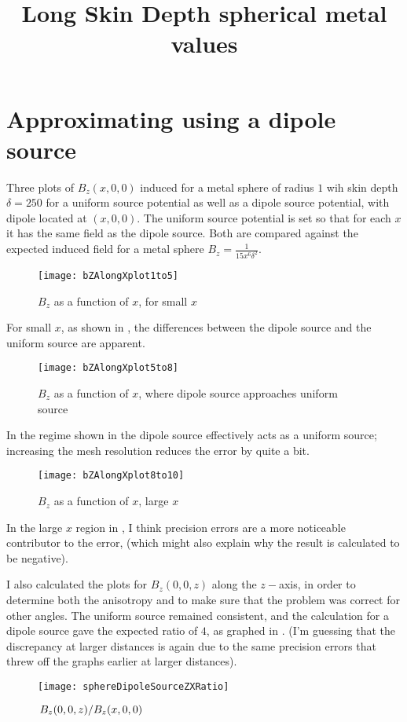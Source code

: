 \documentclass[11pt]{article}
\title{Long Skin Depth spherical metal values}
\date{}
\author{}
\begin{document}
\graphicspath{{figures/}}

\maketitle

\section{Approximating using a dipole source}\label{sec:spheredipolesource}

Three plots of $B_z(x, 0, 0)$ induced for a metal sphere of radius $1$ wih skin depth $\delta = 250$ for a uniform source potential as well
as a dipole source potential, with dipole located at $(x, 0, 0)$.
The uniform source potential is set so that for each $x$ it has the same field as the dipole source.
Both are compared against the expected induced field for a metal sphere $B_z = \frac{1}{15 x^6 \delta^2}$.

\begin{figure}[htp]
	\centering
	\texttt{[image: bZAlongXplot1to5]}
	\caption{$B_z$ as a function of $x$, for small $x$ \label{fig:bZZplotx1to5}}
\end{figure}

For small $x$, as shown in , the differences between the dipole source and the uniform source are
apparent.

\begin{figure}[htp]
	\centering
	\texttt{[image: bZAlongXplot5to8]}
	\caption{$B_z$ as a function of $x$, where dipole source approaches uniform source \label{fig:bZZplotx5to8}}
\end{figure}

In the regime shown in  the dipole source effectively acts as a uniform source;
increasing the mesh resolution reduces the error by quite a bit.

\begin{figure}[htp]
	\centering
	\texttt{[image: bZAlongXplot8to10]}
	\caption{$B_z$ as a function of $x$, large $x$ \label{fig:bZZplotx8to10}}
\end{figure}

In the large $x$ region in , I think precision errors are a more noticeable contributor to the
error, (which might also explain why the result is calculated to be negative).

I also calculated the plots for $B_z(0, 0, z)$ along the $z-$axis, in order to determine both the anisotropy and to
make sure that the problem was correct for other angles.
The uniform source remained consistent, and the calculation for a dipole source gave the expected ratio of $4$,
as graphed in . (I'm guessing that the discrepancy at larger distances is again due to
the same precision errors that threw off the graphs earlier at larger distances).

\begin{figure}[htp]
	\centering
	\texttt{[image: sphereDipoleSourceZXRatio]}
	\caption{$\flatfrac{B_z(0, 0, z)}{B_z(x, 0, 0)}$ \label{fig:dipoleSourceAnisotropy}}
\end{figure}
\end{document}
